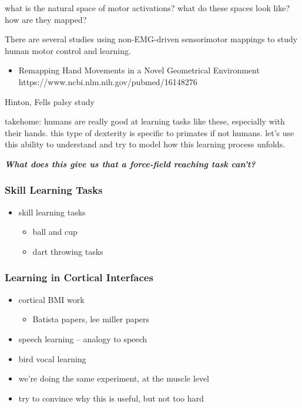 \documentclass[../main.tex]{subfiles}
\begin{document}
what is the natural space of motor activations? what do these spaces look like? how are they mapped?

There are several studies using non-EMG-driven sensorimotor mappings to study human motor control and learning.

\begin{itemize}
\item
  Remapping Hand Movements in a Novel Geometrical Environment
  https://www.ncbi.nlm.nih.gov/pubmed/16148276
\end{itemize}

Hinton, Fells
palsy study

takehome: humans are really good at learning tasks like these, especially with their hands. this type of dexterity is specific to primates if not humans. let's use this ability to understand and try to model how this learning process unfolds.

\textbf{\emph{What does this give us that a force-field reaching task can't?}}

\cite{@nazarpourFlexibleCorticalControl2012}

\subsubsection{Skill Learning Tasks}\label{skill-learning-tasks}

\begin{itemize}
\item
  skill learning tasks

  \begin{itemize}  
  \item
    ball and cup
  \item
    dart throwing tasks
  \end{itemize}
\end{itemize}

\subsubsection{Learning in Cortical Interfaces}\label{learning-in-cortical-interfaces}

\begin{itemize}
\item
  cortical BMI work
  \begin{itemize}  
  \item
    Batista papers, lee miller papers
  \end{itemize}
\item
  speech learning -- analogy to speech
\item
  bird vocal learning
\item
  we're doing the same experiment, at the muscle level
\item
  try to convince why this is useful, but not too hard
\end{itemize}
\end{document}
